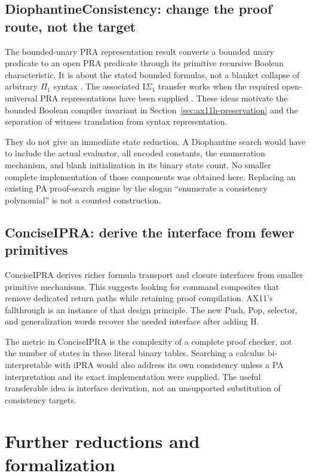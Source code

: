 \documentclass[11pt,a4paper]{article}
\newcommand{\IS}{\mathrm{I}\Sigma_1}
\begin{document}
\subsection{DiophantineConsistency: change the proof route, not the target}

The bounded-unary PRA representation result converts a bounded unary
predicate to an open PRA predicate through its primitive recursive
Boolean characteristic. It is about the stated bounded formulas,
not a blanket collapse of arbitrary $\Pi_1$ syntax
\cite{dio-bounded}. The associated $\IS$ transfer works when the
required open-universal PRA representations have been supplied
\cite{dio-transfer}. These ideas motivate the bounded Boolean
compiler invariant in Section~\ref{sec:ax11h-preservation} and the
separation of witness translation from syntax representation.

They do not give an immediate state reduction. A Diophantine search
would have to include the actual evaluator, all encoded constants,
the enumeration mechanism, and blank initialization in its binary
state count. No smaller complete implementation of those components
was obtained here. Replacing an existing PA proof-search engine by
the slogan ``enumerate a consistency polynomial'' is not a counted
construction.

\subsection{ConciseIPRA: derive the interface from fewer primitives}

ConciseIPRA derives richer formula transport and closure interfaces
from smaller primitive mechanisms. This suggests looking for
command composites that remove dedicated return paths while retaining
proof compilation\cite{concise}. AX11's fallthrough is an instance
of that design principle. The new Push, Pop, selector, and
generalization words recover the needed interface after adding H.

The metric in ConciseIPRA is the complexity of a complete proof
checker, not the number of states in these literal binary tables.
Searching a calculus bi-interpretable with iPRA would also address
its own consistency unless a PA interpretation and its exact
implementation were supplied. The useful transferable idea is
interface derivation, not an unsupported substitution of consistency
targets.

\section{Further reductions and formalization}
\label{sec:next}
\end{document}
